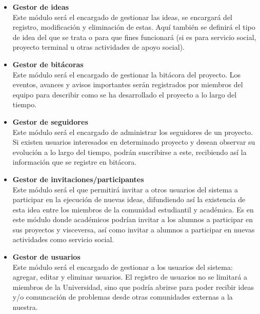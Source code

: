 \documentclass[12pt,letterpaper,titlepage]{article}
\begin{document}
\begin{itemize}

\item \textbf{Gestor de ideas}\\
Este m\'odulo ser\'a el encargado de gestionar las ideas, se encargar\'a del registro, modificaci\'on y eliminaci\'on de estas. Aqu\'i tambi\'en se definir\'a el tipo de idea del que se trata o para que fines funcionar\'a (si es para servicio social, proyecto terminal u otras actividades de apoyo social).

 \item \textbf{Gestor de bit\'acoras}\\
Este m\'odulo ser\'a el encargado de gestionar la bit\'acora del proyecto. Los eventos, avances y avisos importantes ser\'an registrados por miembros del equipo para describir como se ha desarrollado el proyecto a lo largo del tiempo.

 \item \textbf{Gestor de seguidores}\\
Este m\'odulo ser\'a el encargado de administrar los seguidores de un proyecto. Si existen usuarios interesados en determinado proyecto y desean observar su evoluci\'on a lo largo del tiempo, podr\'an suscribirse a este, recibiendo as\'i la informaci\'on que se registre en bit\'acora.

 \item \textbf{Gestor de invitaciones/participantes}\\
Este m\'odulo ser\'a el que permitir\'a invitar a otros usuarios del sistema a participar en la ejecuci\'on de nuevas ideas, difundiendo as\'i la existencia de esta idea entre los miembros de la comunidad estudiantil y acad\'emica. Es en este m\'odulo donde acad\'emicos podr\'ian invitar a los alumnos a participar en sus proyectos y visceversa, as\'i como invitar a alumnos a participar en nuevas actividades como servicio social.



 \item \textbf{Gestor de usuarios}\\
Este m\'odulo ser\'a el encargado de gestionar a los usuarios del sistema: agregar, editar y eliminar usuarios. El registro de usuarios no se limitar\'a a miembros de la Universidad, sino que podr\'ia abrirse para poder recibir ideas y/o comuncaci\'on de problemas desde otras comunidades externas a la nuestra.


\end{itemize}
\end{document}
